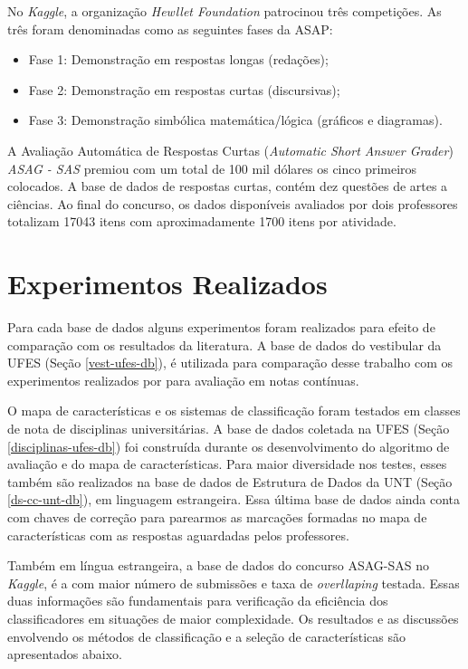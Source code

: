 No \textit{Kaggle}, a organização \textit{Hewllet Foundation} patrocinou três competições. As três foram denominadas como as seguintes fases da ASAP:
\begin{itemize}
\item Fase 1:  Demonstração em respostas longas (redações); 
\item Fase 2:  Demonstração em respostas curtas (discursivas);
\item Fase 3:  Demonstração simbólica matemática/lógica (gráficos e diagramas).
\end{itemize}

A Avaliação Automática de Respostas Curtas (\textit{Automatic Short Answer Grader}) \textit{ASAG - SAS} premiou com um total de 100 mil dólares os cinco primeiros colocados. A base de dados de respostas curtas, contém dez questões de artes a ciências. Ao final do concurso, os dados disponíveis avaliados por dois professores totalizam 17043 itens com aproximadamente 1700 itens por atividade.


\section{Experimentos Realizados}
Para cada base de dados alguns experimentos foram realizados para efeito de comparação com os resultados da literatura. A base de dados do vestibular da UFES (Seção \ref{vest-ufes-db}), é utilizada para comparação desse trabalho com os experimentos realizados por \cite{pissinati2014-master} para avaliação em notas contínuas. 

O mapa de características e os sistemas de classificação foram testados em classes de nota de disciplinas universitárias. A base de dados coletada na UFES (Seção \ref{disciplinas-ufes-db}) foi construída durante os desenvolvimento do algoritmo de avaliação e do mapa de características. Para maior diversidade nos testes, esses também são realizados na base de dados de Estrutura de Dados da UNT (Seção \ref{ds-cc-unt-db}), em linguagem estrangeira. Essa última base de dados ainda conta com chaves de correção para parearmos as marcações formadas no mapa de características com as respostas aguardadas pelos professores.

Também em língua estrangeira, a base de dados do concurso ASAG-SAS no \textit{Kaggle}, é a com maior número de submissões e taxa de \textit{overllaping} testada. Essas duas informações são fundamentais para verificação da eficiência dos classificadores em situações de maior complexidade. Os resultados e as discussões envolvendo os métodos de classificação e a seleção de características são apresentados abaixo.

